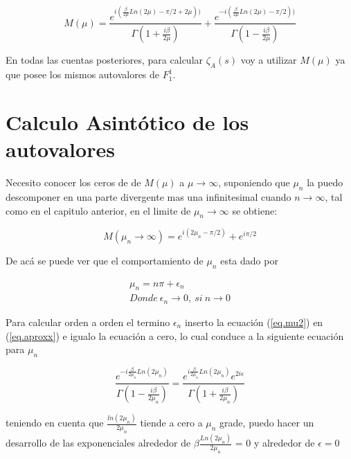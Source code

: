 \begin{equation}
    M (\mu) = 
    \frac{e ^{i (\frac{\beta}{2 \mu} Ln(2 \mu) - \pi/2+ 2 \mu))}}{\Gamma(1+\frac{i \beta}{2 \mu})} + 
    \frac{e ^{- i (\frac{\beta}{2 \mu} Ln(2 \mu) - \pi/2 ))}}{\Gamma(1-\frac{i \beta}{2 \mu})}
\label{eq.aproxx}
\end{equation}

En todas las cuentas posteriores, para calcular $\zeta _A (s)$ voy a utilizar $M ( \mu )$ ya que posee los mismos autovalores de $ F _1 ^1 $.



\section{Calculo Asintótico de los autovalores}

Necesito conocer los ceros de  de $M(\mu)$ a $\mu \rightarrow{\infty}$, suponiendo que $\mu _n$ la puedo descomponer en una parte divergente mas una infinitesimal cuando $n \rightarrow{\infty}$, tal como en el capitulo anterior,
 en el limite de $\mu _n \rightarrow \infty$ se obtiene:

\begin{equation}
    M(\mu _n \rightarrow \infty) = 
    e ^{i (2 \mu _n - \pi /2)} + e^{i \pi/2}
\end{equation}

De acá se puede ver que el comportamiento de $\mu _n$ esta dado por 


\begin{equation}
\begin{array}{c}
    \mu _n = n \pi + \epsilon _n \\
    Donde \ \epsilon _n \rightarrow{0} ,\ si \ n \rightarrow{0}
\end{array}
\label{eq.mu2}
\end{equation}



Para calcular orden a orden el termino $\epsilon _n$ inserto la ecuación (\ref{eq.mu2}) en (\ref{eq.aproxx}) e igualo la ecuación a cero, lo cual conduce a la siguiente ecuación para $\mu _n$

\begin{equation}
    \frac{e ^{- i \frac{\beta}{2 \mu _n} Ln(2 \mu _n)} } {\Gamma(1-\frac{i \beta}{2 \mu _n})} =
    \frac{e ^{ i \frac{\beta}{2 \mu _n} Ln(2 \mu _n)} 
    e ^{2 i \epsilon}
    } {\Gamma(1+\frac{i \beta}{2 \mu _n})}
\end{equation}

teniendo en cuenta que $\frac{ln(2 \mu _n)}{2 \mu _n }$ tiende a cero a $\mu _n$ grade, puedo hacer un desarrollo de las exponenciales alrededor de $ \beta \frac{Ln(2\mu _n)}{2\mu _n}$ = 0 y alrededor de $\epsilon = 0$

